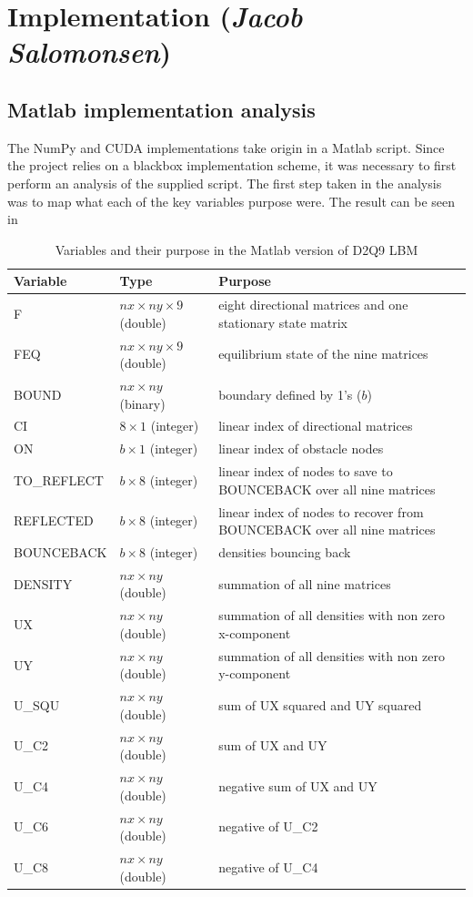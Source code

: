 \section{Implementation (\textit{Jacob Salomonsen})}


\subsection{Matlab implementation analysis}
The NumPy and CUDA implementations take origin in a Matlab script. Since the project relies on a blackbox implementation scheme, it was necessary to first perform an analysis of the supplied script. The first step taken in the analysis was to map what each of the key variables purpose were. The result can be seen in 

\begin{table}[htb]
	\centering
	\begin{tabular}{llp{6cm}}
		\toprule
		Variable & Type & Purpose \\
		\midrule
		F 				& $nx\times ny\times 9$ (double)	& eight directional matrices and one stationary state matrix\\
		FEQ 			& $nx\times ny\times 9$ (double)	& equilibrium state of the nine matrices\\

		BOUND 			& $nx\times ny$ (binary) 		& boundary defined by 1's ($b$)\\
		CI				& $8\times 1$ (integer) 			& linear index of directional matrices\\
		ON				& $b\times 1$ (integer)			& linear index of obstacle nodes\\
		TO\_REFLECT 		& $b\times 8$ (integer)			& linear index of nodes to save to BOUNCEBACK over all nine matrices\\
		REFLECTED 		& $b\times 8$ (integer) 			& linear index of nodes to recover from BOUNCEBACK over all nine matrices \\
		BOUNCEBACK		& $b\times 8$ (integer) 			& densities bouncing back\\
		DENSITY			& $nx\times ny$ (double) 		& summation of all nine matrices\\
		UX				& $nx\times ny$ (double) 		& summation of all densities with non zero x-component\\
		UY				& $nx\times ny$ (double) 		& summation of all densities with non zero y-component \\
		U\_SQU			& $nx\times ny$ (double) 		& sum of UX squared and UY squared\\
		U\_C2			& $nx\times ny$ (double) 		& sum of UX and UY\\
		U\_C4			& $nx\times ny$ (double) 		& negative sum of UX and UY\\
		U\_C6			& $nx\times ny$ (double) 		& negative of U\_C2\\
		U\_C8			& $nx\times ny$ (double) 		& negative of U\_C4\\
		\bottomrule
	\end{tabular}
	\caption{Variables and their purpose in the Matlab version of D2Q9 LBM}
	\label{matlabvars}
\end{table}

